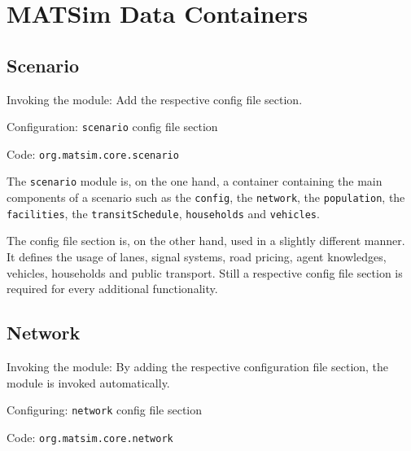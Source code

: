 \section{MATSim Data Containers}
\label{sec:matsim-containers}
\subsection{Scenario}
\label{sec:scenario}
\begin{compactitem}
\item Invoking the module: Add the respective config file section.
\item Configuration: \lstinline|scenario| config file section 
\item Code: \lstinline|org.matsim.core.scenario|
\end{compactitem}

The \lstinline|scenario| module is, on the one hand, a container containing the main components of a scenario such as the \lstinline|config|, the \lstinline|network|, the \lstinline|population|, the \lstinline|facilities|, the \lstinline|transitSchedule|, \lstinline|households| and \lstinline|vehicles|.

The config file section is, on the other hand, used in a slightly different manner. It defines the usage of lanes, signal systems, road pricing, agent knowledges, vehicles, households and public transport. Still a respective config file section is required for every additional functionality. 

\subsection{Network}
\label{sec:network}
\begin{compactitem}
\item Invoking the module: By adding the respective configuration file section, the module is invoked automatically.
\item Configuring: \lstinline|network| config file section
\item Code: \lstinline|org.matsim.core.network|
\end{compactitem}


